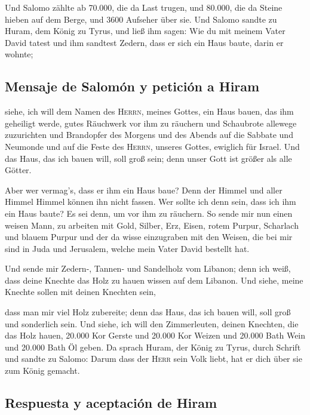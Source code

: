  Und Salomo zählte ab 70.000, die da Last trugen, und
80.000, die da Steine hieben auf dem Berge, und 3600 Aufseher über sie.
 Und Salomo sandte zu Huram, dem König zu Tyrus, und ließ
ihm sagen: Wie du mit meinem Vater David tatest und ihm sandtest Zedern,
dass er sich ein Haus baute, darin er wohnte;

\hypertarget{mensaje-de-salomuxf3n-y-peticiuxf3n-a-hiram}{%
\subsection{Mensaje de Salomón y petición a
Hiram}\label{mensaje-de-salomuxf3n-y-peticiuxf3n-a-hiram}}

 siehe, ich will dem Namen des \textsc{Herrn}, meines
Gottes, ein Haus bauen, das ihm geheiligt werde, gutes Räuchwerk vor ihm
zu räuchern und Schaubrote allewege zuzurichten und Brandopfer des
Morgens und des Abends auf die Sabbate und Neumonde und auf die Feste
des \textsc{Herrn}, unseres Gottes, ewiglich für Israel. 
Und das Haus, das ich bauen will, soll groß sein; denn unser Gott ist
größer als alle Götter.

 Aber wer vermag's, dass er ihm ein Haus baue? Denn der
Himmel und aller Himmel Himmel können ihn nicht fassen. Wer sollte ich
denn sein, dass ich ihm ein Haus baute? Es sei denn, um vor ihm zu
räuchern.  So sende mir nun einen weisen Mann, zu arbeiten
mit Gold, Silber, Erz, Eisen, rotem Purpur, Scharlach und blauem Purpur
und der da wisse einzugraben mit den Weisen, die bei mir sind in Juda
und Jerusalem, welche mein Vater David bestellt hat.

 Und sende mir Zedern-, Tannen- und Sandelholz vom
Libanon; denn ich weiß, dass deine Knechte das Holz zu hauen wissen auf
dem Libanon. Und siehe, meine Knechte sollen mit deinen Knechten sein,

 dass man mir viel Holz zubereite; denn das Haus, das ich
bauen will, soll groß und sonderlich sein.  Und siehe, ich
will den Zimmerleuten, deinen Knechten, die das Holz hauen, 20.000 Kor
Gerste und 20.000 Kor Weizen und 20.000 Bath Wein und 20.000 Bath Öl
geben.  Da sprach Huram, der König zu Tyrus, durch
Schrift und sandte zu Salomo: Darum dass der \textsc{Herr} sein Volk
liebt, hat er dich über sie zum König gemacht.

\hypertarget{respuesta-y-aceptaciuxf3n-de-hiram}{%
\subsection{Respuesta y aceptación de
Hiram}\label{respuesta-y-aceptaciuxf3n-de-hiram}}


